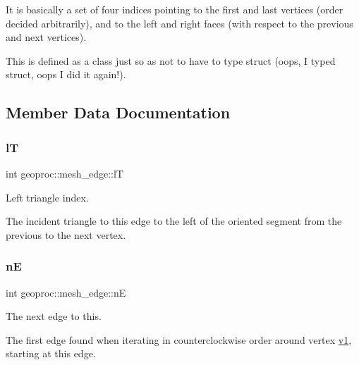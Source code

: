 It is basically a set of four indices pointing to the first and last vertices (order decided arbitrarily), and to the left and right faces (with respect to the previous and next vertices).

This is defined as a \textquotesingle{}class\textquotesingle{} just so as not to have to type \textquotesingle{}struct\textquotesingle{} (oops, I typed \textquotesingle{}struct\textquotesingle{}, oops I did it again!). 

\subsection{Member Data Documentation}
\mbox{\label{classgeoproc_1_1mesh__edge_a348d06b420ce1588be1bc7eac781c6ef}} 
\subsubsection{\texorpdfstring{lT}{lT}}
{\footnotesize\ttfamily int geoproc\+::mesh\+\_\+edge\+::lT}



Left triangle index. 

The incident triangle to this edge to the left of the oriented segment from the previous to the next vertex. \mbox{\label{classgeoproc_1_1mesh__edge_a4ae9cbf7d6c147e75233df48d0451859}} 
\subsubsection{\texorpdfstring{nE}{nE}}
{\footnotesize\ttfamily int geoproc\+::mesh\+\_\+edge\+::nE}



The next edge to this. 

The first edge found when iterating in counterclockwise order around vertex \hyperlink{classgeoproc_1_1mesh__edge_a841e7dc084b54f0abaa6f52b10343e8d}{v1}, starting at this edge. \mbox{\label{classgeoproc_1_1mesh__edge_aef1dd3aadb61d833055489ea8f95d20f}} 
